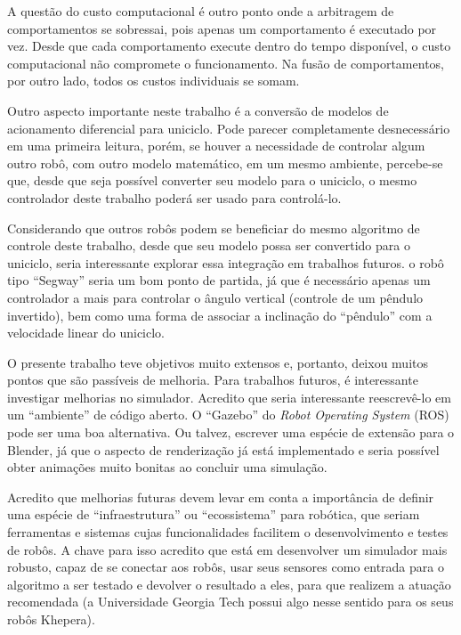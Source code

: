 A questão do custo computacional é outro ponto onde a arbitragem de comportamentos se sobressai,
pois apenas um comportamento é executado por vez. Desde que cada comportamento execute dentro
do tempo disponível, o custo computacional não compromete o funcionamento. Na fusão de 
comportamentos, por outro lado, todos os custos individuais se somam. 

Outro aspecto importante neste trabalho é a conversão de modelos de acionamento diferencial para uniciclo. Pode 
parecer completamente desnecessário em uma primeira leitura, porém, se houver a necessidade de controlar algum outro 
robô, com outro modelo matemático, em um mesmo ambiente, percebe-se que, desde que seja possível converter seu modelo 
para o uniciclo, o mesmo controlador deste trabalho poderá ser usado para controlá-lo.  
 
Considerando que outros robôs podem se beneficiar do mesmo algoritmo de controle deste trabalho, desde que 
seu modelo possa ser convertido para o uniciclo, seria interessante explorar essa integração em trabalhos futuros.
o robô tipo ``Segway'' seria um bom ponto de partida, já que é necessário apenas um controlador a mais para controlar
o ângulo vertical (controle de um pêndulo invertido), bem como uma forma de associar a inclinação do ``pêndulo'' com 
a velocidade linear do uniciclo.

O presente trabalho teve objetivos muito extensos e, portanto, deixou muitos pontos que são passíveis de melhoria.
Para trabalhos futuros, é interessante investigar melhorias no simulador. Acredito que seria interessante reescrevê-lo
em um ``ambiente'' de código aberto. O ``Gazebo'' do \textit{Robot Operating System} (ROS) pode ser uma boa 
alternativa. Ou talvez, escrever uma espécie de extensão para o Blender, já que o aspecto de renderização já está
implementado e seria possível obter animações muito bonitas ao concluir uma simulação.  

Acredito que melhorias futuras devem levar em conta a importância de definir uma espécie de 
``infraestrutura'' ou ``ecossistema'' para robótica, que seriam ferramentas e sistemas cujas
funcionalidades facilitem o desenvolvimento e testes de robôs. A chave para isso acredito que 
está em desenvolver um simulador mais robusto, capaz de se conectar aos robôs, usar seus
sensores como entrada para o algoritmo a ser testado e devolver o resultado a eles, para que
realizem a atuação recomendada (a Universidade Georgia Tech possui algo nesse sentido para 
os seus robôs Khepera). 

